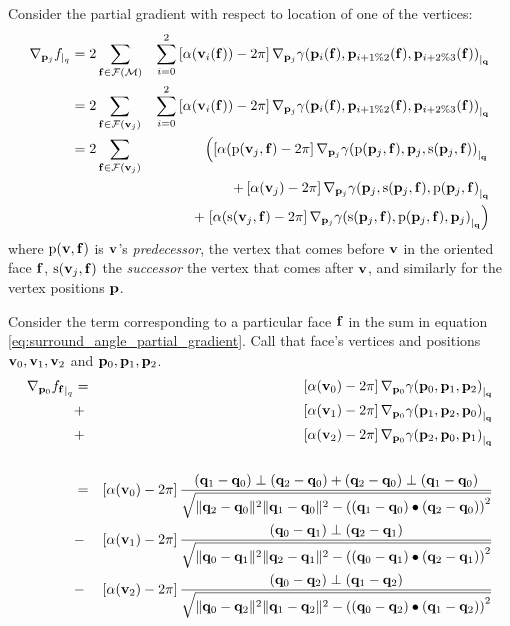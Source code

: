 Consider the partial gradient with respect to
location of one of the vertices:
\begin{eqnarray}
\label{eq:surround_angle_partial_gradient}
\Gc{\p_j}{f}{q}
& = 2 \sum_{\f \in \F(\M)} &
\sum_{i=0}^2
\left[ \alpha(\v_i(\f)) - 2\pi \right]
\Gc{\p_j}{\gamma(\p_i(\f),\p_{i+1 \% 2}(\f),\p_{i+2 \% 3}(\f))}{\q}
\\
& = 2 \sum_{\f \in \F(\v_j)} &
\sum_{i=0}^2
\left[ \alpha(\v_i(\f)) - 2\pi \right]
\Gc{\p_j}{\gamma(\p_i(\f),\p_{i+1 \% 2}(\f),\p_{i+2 \% 3}(\f))}{\q}
\nonumber
\\
& = 2 \sum_{\f \in \F(\v_j)} & \left(
\left[ \alpha({\mathrm p}(\v_j,\f) - 2\pi \right]
\Gc{\p_j}{\gamma({\mathrm p}(\p_j,\f),\p_j,{\mathrm s}(\p_j,\f))}{\q}
\right.
\nonumber
\\
& & +
\left[ \alpha(\v_j) - 2\pi \right]
\Gc{\p_j}{\gamma(\p_j,{\mathrm s}(\p_j,\f),{\mathrm p}(\p_j,\f)}{\q}
\nonumber
\\
& & +
\left.
\left[ \alpha({\mathrm s}(\v_j,\f) - 2\pi \right]
\Gc{\p_j}{\gamma({\mathrm s}(\p_j,\f),{\mathrm p}(\p_j,\f),\p_j)}{\q}
\right)
\nonumber
\end{eqnarray}
where ${\mathrm p}({\mathbf v},{\mathbf f})$ is ${\mathbf v}$'s {\em predecessor},
the vertex that comes before ${\mathbf v}$ in the oriented face ${\mathbf f}$,
${\mathrm s}({\mathbf v}_j,{\mathbf f})$ the {\em successor}
the vertex that comes after ${\mathbf v}$,
and similarly for the vertex positions ${\mathbf p}$.

Consider the term corresponding to a particular face ${\mathbf f}$ in
the sum in equation \ref{eq:surround_angle_partial_gradient}.
Call that face's vertices and positions ${\mathbf v}_0, {\mathbf v}_1, {\mathbf v}_2$
and ${\mathbf p}_0, {\mathbf p}_1, {\mathbf p}_2$.
\begin{eqnarray}
{\mathbf \nabla}_{{\mathbf p}_0}{{f_{{\mathbf f}}}}_{\mid_{q}}
& = &
\left[ \alpha({\mathbf v}_0) - 2\pi \right] {\mathbf \nabla}_{{\mathbf p}_0}{{\gamma({\mathbf p}_0,{\mathbf p}_1,{\mathbf p}_2)}}_{\mid_{{\mathbf q}}}
\\
& + &
\left[ \alpha({\mathbf v}_1) - 2\pi \right] {\mathbf \nabla}_{{\mathbf p}_0}{{\gamma({\mathbf p}_1,{\mathbf p}_2,{\mathbf p}_0)}}_{\mid_{{\mathbf q}}}
\nonumber
\\
& + &
\left[ \alpha({\mathbf v}_2) - 2\pi \right] {\mathbf \nabla}_{{\mathbf p}_0}{{\gamma({\mathbf p}_2,{\mathbf p}_0,{\mathbf p}_1)}}_{\mid_{{\mathbf q}}}
\nonumber
\\
&  &
\nonumber
\\
& = &
\left[ \alpha({\mathbf v}_0) - 2\pi \right]
{{({\mathbf q}_1 - {\mathbf q}_0) \perp ({\mathbf q}_2 - {\mathbf q}_0) + ({\mathbf q}_2 - {\mathbf q}_0) \perp ({\mathbf q}_1 - {\mathbf q}_0)}
\over
{
\sqrt{
\| {\mathbf q}_2 - {\mathbf q}_0 \|^2 \| {\mathbf q}_1 - {\mathbf q}_0 \|^2
-
\left( ( {\mathbf q}_1 -{\mathbf q}_0 ) \bullet ( {\mathbf q}_2 -{\mathbf q}_0 ) \right)^2
}
}}
\nonumber
\\
& - &
\left[ \alpha({\mathbf v}_1) - 2\pi \right]
{{({\mathbf q}_0 - {\mathbf q}_1) \perp ({\mathbf q}_2 - {\mathbf q}_1)}
\over
{
\sqrt{
\| {\mathbf q}_0 - {\mathbf q}_1 \|^2 \| {\mathbf q}_2 - {\mathbf q}_1 \|^2
-
\left( ( {\mathbf q}_0 -{\mathbf q}_1 ) \bullet ( {\mathbf q}_2 - {\mathbf q}_1 ) \right)^2
}
}}
\nonumber
\\
& - &
\left[ \alpha({\mathbf v}_2) - 2\pi \right]
{{({\mathbf q}_0 - {\mathbf q}_2) \perp ({\mathbf q}_1 - {\mathbf q}_2)}
\over
{
\sqrt{
\| {\mathbf q}_0 - {\mathbf q}_2 \|^2 \| {\mathbf q}_1 - {\mathbf q}_2 \|^2
-
\left( ( {\mathbf q}_0 -{\mathbf q}_2 ) \bullet ( {\mathbf q}_1 -{\mathbf q}_2 ) \right)^2
}
} }
\nonumber
\end{eqnarray}
